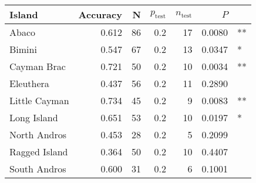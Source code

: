 
\begin{tabular}{lrrrrrl}
\toprule
Island & Accuracy & N & $p_{\mbox{test}}$ & $n_{\mbox{test}}$ & $P$ & \\
\midrule
Abaco & 0.612 & 86 & 0.2 & 17 & 0.0080 & **\\
Bimini & 0.547 & 67 & 0.2 & 13 & 0.0347 & *\\
Cayman Brac & 0.721 & 50 & 0.2 & 10 & 0.0034 & **\\
Eleuthera & 0.437 & 56 & 0.2 & 11 & 0.2890 & \\
Little Cayman & 0.734 & 45 & 0.2 & 9 & 0.0083 & **\\
Long Island & 0.651 & 53 & 0.2 & 10 & 0.0197 & *\\
North Andros & 0.453 & 28 & 0.2 & 5 & 0.2099 & \\
Ragged Island & 0.364 & 50 & 0.2 & 10 & 0.4407 & \\
South Andros & 0.600 & 31 & 0.2 & 6 & 0.1001 & \\
\bottomrule
\end{tabular}
